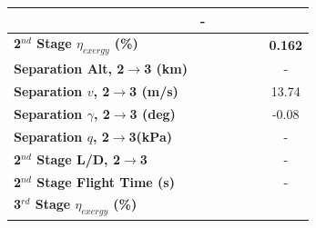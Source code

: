 \begin{table}[ht!]
\begin{tabular}{l c c c c c c}
		& -
		\\
		\hline 
		\textbf{2$^{nd}$ Stage $\eta_{exergy}$ (\%)}
		& \textbf{\secondExergyEffIspNinetyNoReturn}
		& \textbf{\secondExergyEffIspNinetyFiveNoReturn}
		& \textbf{\secondExergyEffIspStandardNoReturn}
		& \textbf{\secondExergyEffIspOneHundredFiveNoReturn}
		& \textbf{\secondExergyEffIspOneHundredTenNoReturn}
		& \textbf{0.162}
		\\
		\textbf{Separation Alt, 2$\rightarrow$3 (km)}
		& \secondthirdSeparationAltIspNinetyNoReturn
		& \secondthirdSeparationAltIspNinetyFiveNoReturn
		& \secondthirdSeparationAltIspStandardNoReturn
		& \secondthirdSeparationAltIspOneHundredFiveNoReturn
		& \secondthirdSeparationAltIspOneHundredTenNoReturn
		& -
		\\
		\textbf{Separation $v$, 2$\rightarrow$3 (m/s)}
		& \secondthirdSeparationvIspNinetyNoReturn
		& \secondthirdSeparationvIspNinetyFiveNoReturn
		& \secondthirdSeparationvIspStandardNoReturn
		& \secondthirdSeparationvIspOneHundredFiveNoReturn
		& \secondthirdSeparationvIspOneHundredTenNoReturn
		&13.74
		\\
		\textbf{Separation $\gamma$, 2$\rightarrow$3 (deg)}
		& \secondthirdSeparationgammaIspNinetyNoReturn
		& \secondthirdSeparationgammaIspNinetyFiveNoReturn
		& \secondthirdSeparationgammaIspStandardNoReturn
		& \secondthirdSeparationgammaIspOneHundredFiveNoReturn
		& \secondthirdSeparationgammaIspOneHundredTenNoReturn
		&-0.08
		\\
		\textbf{Separation $q$, 2$\rightarrow$3(kPa)}
		& \secondthirdSeparationqIspNinetyNoReturn
		& \secondthirdSeparationqIspNinetyFiveNoReturn
		& \secondthirdSeparationqIspStandardNoReturn
		& \secondthirdSeparationqIspOneHundredFiveNoReturn
		& \secondthirdSeparationqIspOneHundredTenNoReturn
		& -
		\\
		\textbf{2$^{nd}$ Stage L/D, 2$\rightarrow$3}
		& \secondthirdSeparationLDIspNinetyNoReturn
		& \secondthirdSeparationLDIspNinetyFiveNoReturn
		& \secondthirdSeparationLDIspStandardNoReturn
		& \secondthirdSeparationLDIspOneHundredFiveNoReturn
		& \secondthirdSeparationLDIspOneHundredTenNoReturn
		& -
		\\
		\textbf{2$^{nd}$ Stage Flight Time (s)}
		& \secondFlightTimeIspNinetyNoReturn
		& \secondFlightTimeIspNinetyFiveNoReturn
		& \secondFlightTimeIspStandardNoReturn
		& \secondFlightTimeIspOneHundredFiveNoReturn
		& \secondFlightTimeIspOneHundredTenNoReturn
		& -
		\\
		\hline 
		\textbf{3$^{rd}$ Stage $\eta_{exergy}$ (\%)}
		& \textbf{\thirddExergyEffIspNinetyNoReturn}

\end{tabular}
\end{table}

